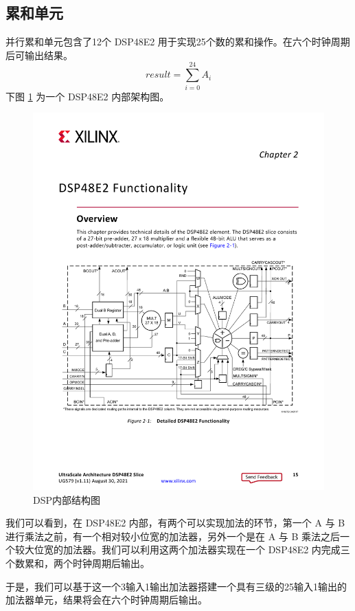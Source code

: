 \documentclass[12pt, a4paper, oneside]{ctexbook}
\begin{document}
	\subsection{累和单元}
	并行累和单元包含了12个 DSP48E2 用于实现25个数的累和操作。在六个时钟周期后可输出结果。
	$$
	result = \sum_{i=0}^{24}A_i
	$$
	下图 \ref{DSP} 为一个 DSP48E2 内部架构图。
		\begin{figure}[h]
		\centering
		\includegraphics[scale=0.87]{pic/DSP}
		\caption{DSP内部结构图}
		\label{DSP}
		\end{figure}
	\par 我们可以看到，在 DSP48E2 内部，有两个可以实现加法的环节，第一个 A 与 B 进行乘法之前，有一个相对较小位宽的加法器，另外一个是在 A 与 B 乘法之后一个较大位宽的加法器。我们可以利用这两个加法器实现在一个 DSP48E2 内完成三个数累和，两个时钟周期后输出。\par 于是，我们可以基于这一个3输入1输出加法器搭建一个具有三级的25输入1输出的加法器单元，结果将会在六个时钟周期后输出。\par 
\end{document}
